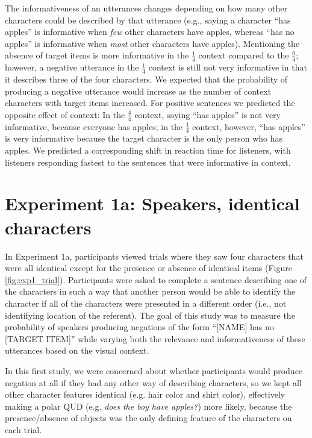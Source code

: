 \documentclass[man, floatsintext, noapacite]{apa6}
\begin{document}
The informativeness of an utterances changes depending on how many other characters could be described by that utterance (e.g., saying a character ``has apples'' is informative when \textit{few} other characters have apples, whereas ``has no apples'' is informative when \textit{most} other characters have apples). Mentioning the absence of target items is more informative in the $\frac{1}{4}$  context compared to the $\frac{0}{4}$;  however, a negative utterance in the $\frac{1}{4}$ context is still not very informative in that it describes three of the four characters. We expected that the probability of producing a negative utterance would increase as the number of context characters with target items increased. For positive sentences we predicted the opposite effect of context: In the $\frac{4}{4}$ context, saying ``has apples'' is not very informative, because everyone has apples; in the $\frac{1}{4}$ context, however, ``has apples'' is very informative because the target character is the only person who has apples. We predicted a corresponding shift in reaction time for listeners, with listeners responding fastest to the sentences that were informative in context.

\section{Experiment 1a: Speakers, identical characters}

In Experiment 1a, participants viewed trials where they saw four characters that were all identical except for the presence or absence of identical items (Figure \ref{fig:exp1_trial}). Participants were asked to complete a sentence describing one of the characters in such a way that another person would be able to identify the character if all of the characters were presented in a different order (i.e., not identifying location of the referent). The goal of this study was to measure the probability of speakers producing negations of the form ``[NAME] has no [TARGET ITEM]'' while varying both the relevance and informativeness of these utterances based on the visual context. 

In this first study, we were concerned about whether participants would produce negation at all if they had any other way of describing characters, so we kept all other character features identical (e.g. hair color and shirt color), effectively making a polar QUD (e.g. \textit{does the boy have apples?}) more likely, because the presence/absence of objects was the only defining feature of the characters on each trial. 
\end{document}

